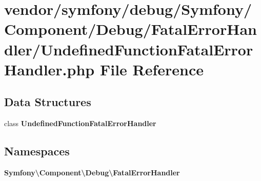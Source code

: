 \section{vendor/symfony/debug/\+Symfony/\+Component/\+Debug/\+Fatal\+Error\+Handler/\+Undefined\+Function\+Fatal\+Error\+Handler.php File Reference}
\label{_undefined_function_fatal_error_handler_8php}
\subsection*{Data Structures}
\begin{DoxyCompactItemize}
\item 
class {\bf Undefined\+Function\+Fatal\+Error\+Handler}
\end{DoxyCompactItemize}
\subsection*{Namespaces}
\begin{DoxyCompactItemize}
\item 
 {\bf Symfony\textbackslash{}\+Component\textbackslash{}\+Debug\textbackslash{}\+Fatal\+Error\+Handler}
\end{DoxyCompactItemize}
